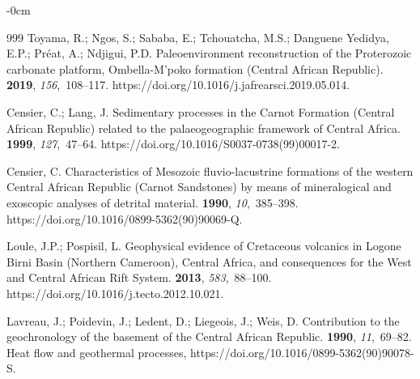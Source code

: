 \documentclass[minerals,article,accept,pdftex,moreauthors]{Definitions/mdpi}
\begin{document}
\begin{adjustwidth}{-\extralength}{0cm}
\begin{thebibliography}{999}
Toyama, R.; Ngos, S.; Sababa, E.; Tchouatcha, M.S.; {Danguene Yedidya}, E.P.;
  Préat, A.; Ndjigui, P.D.
\newblock Paleoenvironment reconstruction of the Proterozoic carbonate
  platform, Ombella-M'poko formation (Central African Republic).
 {\bf 2019}, {\em
  156},~108--117.
\newblock https://doi.org/10.1016/j.jafrearsci.2019.05.014.

Censier, C.; Lang, J.
\newblock Sedimentary processes in the Carnot Formation (Central African
  Republic) related to the palaeogeographic framework of Central Africa.
 {\bf 1999}, {\em 127},~47--64.
\newblock https://doi.org/10.1016/S0037-0738(99)00017-2.

Censier, C.
\newblock Characteristics of Mesozoic fluvio-lacustrine formations of the
  western Central African Republic (Carnot Sandstones) by means of
  mineralogical and exoscopic analyses of detrital material.
 {\bf %
  1990}, {\em 10},~385--398.
\newblock https://doi.org/10.1016/0899-5362(90)90069-Q.

Loule, J.P.; Pospisil, L.
\newblock Geophysical evidence of Cretaceous volcanics in Logone Birni Basin
  (Northern Cameroon), Central Africa, and consequences for the West and
  Central African Rift System.
 {\bf 2013}, {\em 583},~88--100.
\newblock https://doi.org/10.1016/j.tecto.2012.10.021.

Lavreau, J.; Poidevin, J.; Ledent, D.; Liegeois, J.; Weis, D.
\newblock Contribution to the geochronology of the basement of the Central
  African Republic.
 {\bf
  1990}, {\em 11},~69--82. %
\newblock Heat flow and geothermal processes,
  https://doi.org/10.1016/0899-5362(90)90078-S.


\end{thebibliography}
\end{adjustwidth}
\end{document}
